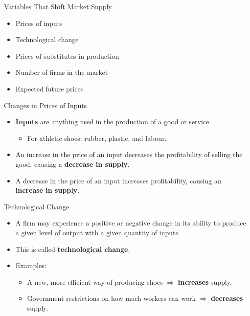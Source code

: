 \documentclass[aspectratio=169]{beamer}
\begin{document}
\begin{frame}{Variables That Shift Market Supply}
\transfade
\begin{itemize}
  \item Prices of inputs
  \item Technological change
  \item Prices of substitutes in production
  \item Number of firms in the market
  \item Expected future prices
\end{itemize}
\end{frame}

\begin{frame}{Changes in Prices of Inputs}
\transfade
\begin{itemize}
  \item \textbf{Inputs} are anything used in the production of a good or service.
  \begin{itemize}
    \item For athletic shoes: rubber, plastic, and labour.
  \end{itemize}
  \item An \alert{increase} in the price of an input decreases the profitability of selling the good, causing a \textbf{decrease in supply}.
  \item A \alert{decrease} in the price of an input increases profitability, causing an \textbf{increase in supply}.
\end{itemize}
\end{frame}

\begin{frame}{Technological Change}
\transfade
\begin{itemize}
  \item A firm may experience a positive or negative change in its ability to produce a given level of output with a given quantity of inputs.
  \item This is called \textbf{technological change}.
  \item Examples:
  \begin{itemize}
    \item A new, more efficient way of producing shoes \(\Rightarrow\) \textbf{increases} supply.
    \item Government restrictions on how much workers can work \(\Rightarrow\) \textbf{decreases} supply.
  \end{itemize}
\end{itemize}
\end{frame}
\end{document}
